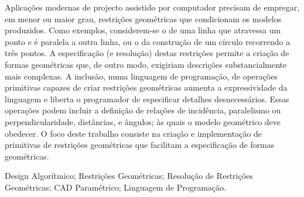 \begin{pt}
\begin{resumo}
Aplicações modernas de projecto assistido por computador precisam de empregar,
em menor ou maior grau, restrições geométricas que condicionam os modelos
produzidos.  Como exemplos, considerem-se o de uma linha que atravessa um ponto
e é paralela a outra linha, ou o da construção de um círculo recorrendo a três
pontos.  A especificação (e resolução) destas restrições permite a criação de
formas geométricas que, de outro modo, exigiriam descrições substancialmente
mais complexas.  A inclusão, numa linguagem de programação, de operações
primitivas capazes de criar restrições geométricas aumenta a expressividade da
linguagem e liberta o programador de especificar detalhes desnecessários.  Essas
operações podem incluir a definição de relações de incidência, paralelismo ou
perpendicularidade, distâncias, e ângulos; às quais o modelo geométrico deve
obedecer.  O foco deste trabalho consiste na criação e implementação de
primitivas de restrições geométricas que facilitam a especificação de formas
geométricas.
\end{resumo}

\begin{palavraschave}
\noindent
Design Algorítmico;
Restrições Geométricas;
Resolução de Restrições Geométricas;
CAD Paramétrico;
Linguagem de Programação.
\end{palavraschave}
\end{pt}

\clearpage
\thispagestyle{empty}
